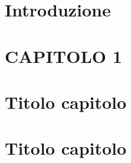 \documentclass[14pt]{extreport}
\begin{document}
\newpage
	

\tableofcontents
\listoffigures %
\listoftables %




\chapter*{Introduzione}
\setcounter{page}{1} 		




\chapter{CAPITOLO 1}


\chapter{Titolo capitolo}


\chapter{Titolo capitolo}



\end{document}
